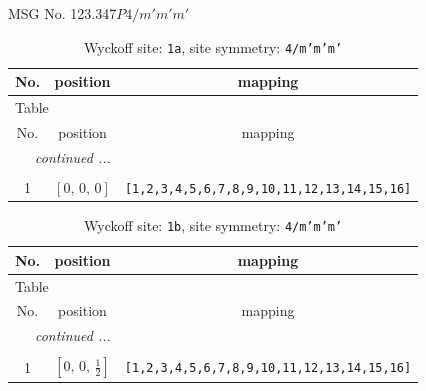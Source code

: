 \documentclass[fleqn,8pt]{jsarticle}
\begin{document}
\setcounter{MaxMatrixCols}{32}

\renewcommand{\tablename}{Table~}
\renewcommand{\figurename}{Figure~}
\begin{center}
\LARGE
MSG No. 123.347\quad$P4/m'm'm'$
\end{center}
\renewcommand{\arraystretch}{1.2}
\begin{longtable}{ccc}
\caption{Wyckoff site: {\tt 1a}, site symmetry: {\tt 4/m'm'm'}}
 \\
 \hline \hline
No. & position & mapping \\ \hline \endfirsthead

\multicolumn{2}{l}{\tablename\ \thetable{}} \\
 \hline \hline
No. & position & mapping \\ \hline \endhead

 \hline \hline
\multicolumn{2}{r}{\footnotesize\it continued ...} \\ \endfoot

 \hline \hline
\multicolumn{2}{r}{} \\ \endlastfoot

1 & $\left[ 0,\, 0,\, 0 \right]$ & {\tt [1,2,3,4,5,6,7,8,9,10,11,12,13,14,15,16]} \\
\end{longtable}
\renewcommand{\arraystretch}{1.2}
\begin{longtable}{ccc}
\caption{Wyckoff site: {\tt 1b}, site symmetry: {\tt 4/m'm'm'}}
 \\
 \hline \hline
No. & position & mapping \\ \hline \endfirsthead

\multicolumn{2}{l}{\tablename\ \thetable{}} \\
 \hline \hline
No. & position & mapping \\ \hline \endhead

 \hline \hline
\multicolumn{2}{r}{\footnotesize\it continued ...} \\ \endfoot

 \hline \hline
\multicolumn{2}{r}{} \\ \endlastfoot

1 & $\left[ 0,\, 0,\, \frac{1}{2} \right]$ & {\tt [1,2,3,4,5,6,7,8,9,10,11,12,13,14,15,16]} \\
\end{longtable}
\renewcommand{\arraystretch}{1.2}
\end{document}
